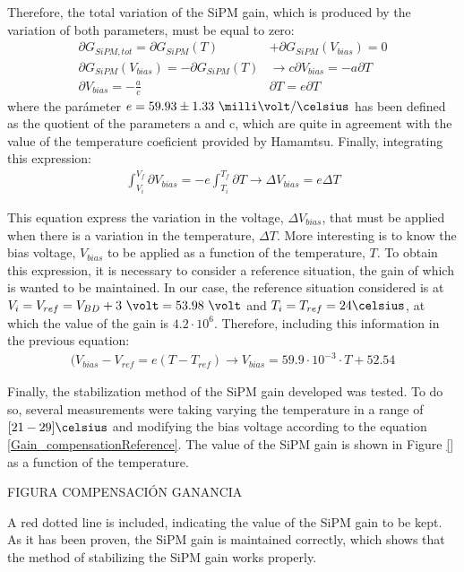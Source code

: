 Therefore, the total variation of the SiPM gain, which is produced by the variation of both parameters, must be equal to zero:
\begin{equation*}
\begin{split}
\partial G_{SiPM, tot}= \partial G_{SiPM}(T) &+ \partial G_{SiPM}(V_{bias}) = 0\\ 
\partial G_{SiPM}(V_{bias}) = -\partial G_{SiPM}(T) &\longrightarrow c \partial V_{bias} = - a \partial T\\ 
\partial V_{bias}  = - \frac{a}{c}&\partial T = e \partial T
\label{Gain_compensation0}
\end{split}
\end{equation*} 
where the parámeter $e= 59.93 \pm 1.33~\milli\volt/\celsius $ has been defined as the quotient of the parameters a and c, which are quite in agreement with the value of the temperature coeficient provided by Hamamtsu. Finally, integrating this expression:
\begin{equation*}
\begin{split}
\int_{V_i}^{V_f}\partial V_{bias}  = - e\int_{T_i}^{T_f}\partial T \longrightarrow \Delta V_{bias} = e \Delta T
\label{Gain_compensationIntegring}
\end{split}
\end{equation*} 

This equation express the variation in the voltage, $\Delta V_{bias}$, that must be applied when there is a variation in the temperature, $\Delta T$. More interesting is to know the bias voltage, $V_{bias}$ to be applied as a function of the temperature, $T$. To obtain this expression, it is necessary to consider a reference situation, the gain of which is wanted to be maintained. In our case, the reference situation considered is at $V_i=V_{ref}= V_{BD}+3~\volt = 53.98~\volt$ and $T_i=T_{ref}=24\celsius$, at which the value of the gain is $4.2 \cdot{} 10^{6}$. Therefore, including this information in the previous equation:
\begin{equation*}
\begin{split}
(V_{bias}-V_{ref} = e \left( T -T_{ref} \right) \longrightarrow V_{bias}= 59.9 \cdot{} 10^{-3} \cdot{} T + 52.54
\label{Gain_compensationReference}
\end{split}
\end{equation*} 

Finally, the stabilization method of the SiPM gain developed was tested. To do so, several measurements were taking varying the temperature in a range of $[21-29]\celsius$ and modifying the bias voltage according to the equation \ref{Gain_compensationReference}. The value of the SiPM gain is shown in Figure \ref{} as a function of the temperature.

FIGURA COMPENSACIÓN GANANCIA

A red dotted line is included, indicating the value of the SiPM gain to be kept. As it has been proven, the SiPM gain is maintained correctly, which shows that the method of stabilizing the SiPM gain works properly.